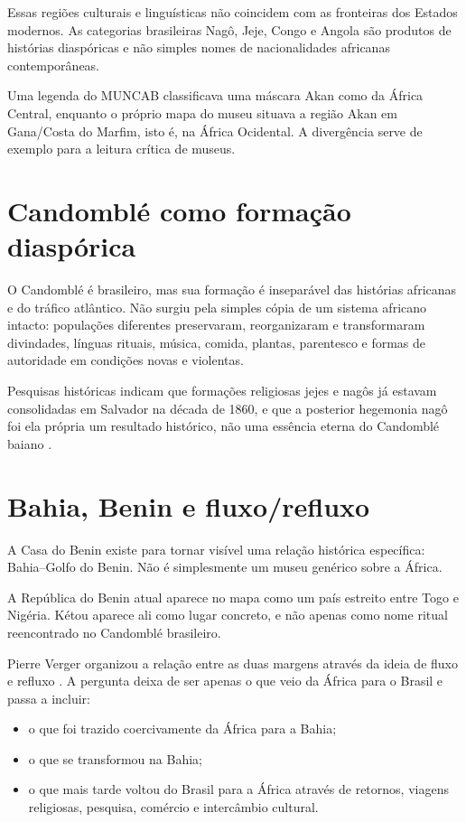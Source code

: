 Essas regiões culturais e linguísticas não
coincidem com as fronteiras dos
Estados modernos. As categorias brasileiras
Nagô, Jeje, Congo e Angola são
produtos de histórias diaspóricas e não
simples nomes de nacionalidades
africanas contemporâneas.

Uma legenda do MUNCAB classificava uma
máscara Akan como da África Central,
enquanto o próprio mapa do museu situava a
região Akan em Gana/Costa do Marfim, isto é,
na África Ocidental. A divergência serve de
exemplo para a leitura crítica de museus.

\section{Candomblé como formação diaspórica}
\label{section-historia-candomble-formacao}

O Candomblé é brasileiro, mas sua formação é
inseparável das histórias
africanas e do tráfico atlântico. Não surgiu
pela simples cópia de um sistema
africano intacto: populações diferentes
preservaram, reorganizaram e
transformaram divindades, línguas rituais,
música, comida, plantas, parentesco
e formas de autoridade em condições novas e
violentas.

Pesquisas históricas indicam que formações
religiosas jejes e nagôs já estavam
consolidadas em Salvador na década de 1860, e
que a posterior hegemonia nagô
foi ela própria um resultado histórico, não
uma essência eterna do Candomblé
baiano \cite{pares2010nago}.

\section{Bahia, Benin e fluxo/refluxo}
\label{section-bahia-benin-fluxo}

A Casa do Benin existe para tornar visível
uma relação histórica específica:
Bahia--Golfo do Benin. Não é simplesmente um
museu genérico sobre a África.

A República do Benin atual aparece no mapa
como um país estreito entre Togo e
Nigéria. Kétou aparece ali como lugar
concreto, e não apenas como nome ritual
reencontrado no Candomblé brasileiro.

Pierre Verger organizou a relação entre as
duas margens através da ideia de
fluxo e refluxo \cite{verger2021fluxo}. A
pergunta deixa de ser apenas o
que veio da África para o Brasil e passa a
incluir:
\begin{itemize}
\item o que foi trazido coercivamente da
      África para a Bahia;
\item o que se transformou na Bahia;
\item o que mais tarde voltou do Brasil para
      a África através de retornos,
viagens religiosas, pesquisa, comércio e
intercâmbio cultural.
\end{itemize}

